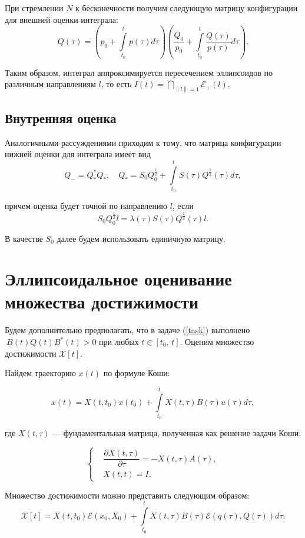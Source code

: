 \documentclass[16pt]{article}
\newcommand\Norm[1]{\left\| #1 \right\|}
\newcommand\Int[2]{\int\limits_{#1}^{#2}}
\begin{document}
При стремлении $N$ к бесконечности получим следующую матрицу конфигурации для внешней оценки интеграла:
$$Q(\tau) = \left( p_0 + \int\limits_{t_0}^{t} p(\tau)d\tau\right)\left( \dfrac{Q_0}{p_0} + \int\limits_{t_0}^{t}\dfrac{Q(\tau)}{p(\tau)}d\tau\right).$$

Таким образом, интеграл аппроксимируется пересечением эллипсоидов по различным направлениям $l$, то есть $I(t) = \bigcap\limits_{\Norm{l} = 1} \mathcal{E}_+(l)$.

\subsection{Внутренняя оценка}
Аналогичными рассуждениями приходим к тому, что матрица конфигурации нижней оценки для интеграла имеет вид
$$Q_- = Q_*^*Q_*, \quad Q_* = S_0Q_0^\frac12 + \Int{t_0}{t}S(\tau)Q^\frac12(\tau)d\tau,$$

причем оценка будет точной по направлению $l$, если 
$$S_0Q_0^\frac12l = \lambda(\tau)S(\tau)Q^\frac12(\tau)l.$$

В качестве $S_0$ далее будем использовать единичную матрицу.

\section{Эллипсоидальное оценивание множества достижимости}
Будем дополнительно предполагать, что в задаче (\ref{task}) выполнено $\ B(t)Q(t)B^*(t) > 0$ при любых $t \in [t_0,\, t]$. Оценим множество достижимости $\mathcal{X}[t]$.

Найдем траекторию $x(t)$ по формуле Коши:

$$x(t) = X(t, t_0)x(t_0) + \int\limits_{t_0}^{t} X(t, \tau)B(\tau)u(\tau)d\tau,$$

где $X(t, \tau)$ --- фундаментальная матрица, полученная как решение задачи Коши:

\begin{equation}\label{fund}
\left\{
\begin{aligned}
&\dfrac{\partial X(t, \tau)}{\partial \tau} = -X(t, \tau)A(\tau),\\
&X(t, t) = I.
\end{aligned}
\right.
\end{equation}



Множество достижимости можно представить следующим образом:
$$
\mathcal{X}[t] = X(t, t_0)\mathcal{E}(x_0, X_0) + \int\limits_{t_0}^{t}X(t, \tau)B(\tau)\mathcal{E}(q(\tau), Q(\tau))d\tau.
$$
\end{document}
